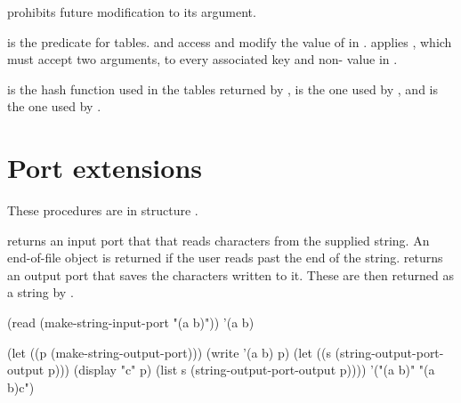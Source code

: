  prohibits future modification to its argument.

\begin{protos}
\end{protos}
\noindent
{} is the predicate for tables.
 and  access and modify the value of 
 in .
 applies , which must accept two arguments,
 to every associated key and non- value in .

\begin{protos}
\end{protos}
\noindent
{} is the hash function used in the tables
 returned by ,  is the one used
 by , and  is the one used
 by .

\section{Port extensions}

These procedures are in structure .

\begin{protos}
\end{protos}
\noindent {} returns an input port that
 that reads characters from the supplied string.  An end-of-file
 object is returned if the user reads past the end of the string.
 returns an output port that saves
 the characters written to it.
These are then returned as a string by .

\begin{example}
(read (make-string-input-port "(a b)"))
    \evalsto '(a b)

(let ((p (make-string-output-port)))
  (write '(a b) p)
  (let ((s (string-output-port-output p)))
    (display "c" p)
    (list s (string-output-port-output p))))
    \evalsto '("(a b)" "(a b)c")
\end{example}

